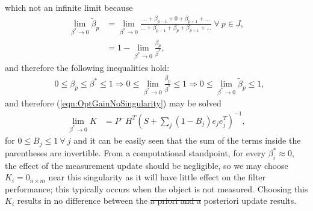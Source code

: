 \documentclass[letterpaper, 10pt, conference]{ieeeconf}
\newcommand{\refeqn}[1]{(\ref{eqn:#1})}
\providecommand{\DIFadd}[1]{{\protect\color{blue}\uwave{#1}}} %
\providecommand{\DIFdel}[1]{{\protect\color{red}\sout{#1}}}                      %
\providecommand{\DIFaddbegin}{} %
\providecommand{\DIFaddend}{} %
\providecommand{\DIFdelbegin}{} %
\providecommand{\DIFdelend}{} %
\begin{document}
\begin{appendix}
which not an infinite limit because
\begin{align}
\lim_{\beta^* \to 0}\tilde\beta_p&=\lim_{\beta^* \to 0}\frac{...+\beta_{p-1}+0+\beta_{p+1}+...}{...+\beta_{p-1}+\beta_p+\beta_{p+1}+...}\ \forall\ p\in J,\nonumber
\\
&=1-\lim_{\beta^* \to 0}\frac{\beta_p}{\beta^*},
\end{align}
and therefore the following inequalities hold:
\begin{align}
&0\leq\beta_p\leq\beta^*\leq1\Rightarrow0\leq\lim_{\beta^* \to 0}\frac{\beta_p}{\beta^*}\leq1\Rightarrow0\leq\lim_{\beta^* \to 0}\tilde\beta_p\leq1,
\end{align}
and therefore \refeqn{OptGainNoSingularity} may be solved
\begin{align}
\lim_{\beta^* \to 0}K
&=P^-H^T
(S+\sum\limits_{j}(1-B_j)e_{j}e_{j}^T)^{-1},
\label{eqn:OptGainNoSingularitySolved}
\end{align}
for $0\leq B_j\leq1\ \forall\ j$ and it can be easily seen that the sum of the terms inside the parentheses are invertible.
From a computational standpoint, for every $\beta^*_i\approx0$, the effect of the measurement update should be negligible, so we may choose $K_i=0_{n\times m}$ near this singularity as it will have little effect on the filter performance; this typically occurs when the object is not measured.
 Choosing this $K_i$ results in no difference between the \DIFdelbegin \DIFdel{a priori and a }\DIFdelend \DIFaddbegin \DIFadd{priori and }\DIFaddend posteriori update results. 


\end{appendix}
\end{document}

